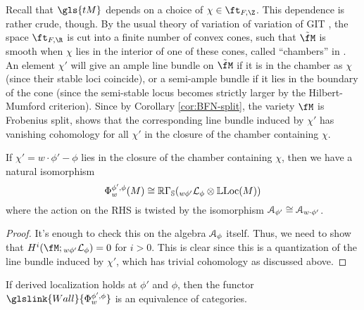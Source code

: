 Recall that $\gls{tM}$ depends on a choice of $\chi\in \ft_{F,\Z}$.  This dependence is rather crude, though.  By the usual theory of variation of variation of GIT \cite{DHGIT}, the space $\ft_{F,\R}$ is cut into a finite number of convex cones, such that $\tilde{\fM}$ is smooth when $\chi$ lies in the interior of one of these cones, called ``chambers'' in \cite{DHGIT}. An element $\chi'$ will give an ample line bundle on $\tilde{\fM}$ if it is in the chamber as $\chi$ (since their stable loci coincide), or a semi-ample bundle if it lies in the boundary of the cone (since the semi-stable locus becomes strictly larger by the Hilbert-Mumford criterion).   Since by Corollary \ref{cor:BFN-split}, the variety $\fM$ is Frobenius split, \cite[Thm. 1.4.8]{BrionKumar} shows that the corresponding line bundle induced by $\chi'$ has vanishing cohomology for all $\chi'$ in the closure of the chamber containing $\chi$.
\begin{lemma}\label{lem:localize-twist}
If $\chi'=w\cdot \phi'-\phi$ lies in the closure of the chamber containing $\chi$, then we have a natural isomorphism \[\Phi_w^{\phi',\phi}(M)\cong\mathbb{R}\Gamma_{\mathbb{S}}({}_{w\phi'}\mathcal{L}_{\phi}\otimes \mathbb{L}\!\operatorname{Loc}(M))\] where the action on the RHS is twisted by the isomorphism $\EuScript{A}_{\phi'}\cong \EuScript{A}_{w\cdot \phi'}$.  
\end{lemma}
\begin{proof}
It's enough to check this on the algebra $\EuScript{A}_{\phi}$ itself. Thus, we need to show that $H^i(\fM;{}_{w\phi'}\mathcal{L}_{\phi})=0$ for $i>0$.  This is clear since this is a quantization of the line bundle induced by $\chi'$, which has trivial cohomology as discussed above.
\end{proof}

\begin{corollary}
If derived localization holds at $\phi'$ and $\phi$, then the functor $\glslink{Wall}{\Phi_w^{\phi',\phi}}$ is an equivalence of categories. 
\end{corollary}


